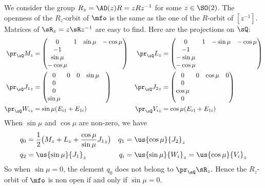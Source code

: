 We consider the group $R_z=\AD(z)R=zRz^{-1}$ for some $z\in \SO(2)$. The openness of the $R_z$-orbit of $\mfo$ is the same as the one of the $R$-orbit of $[z^{-1}]$. Matrices of $\sR_z=z\sR z^{-1}$ are easy to find. Here are the projections on $\sQ$:
\begin{subequations}
	\begin{align}
		\pr_{\sQ} M_z     & =
		\begin{pmatrix}
			0 & 1 & \sin\mu & -\cos\mu \\
			-1                         \\
			\sin\mu                    \\
			-\cos\mu
		\end{pmatrix}
		                  & \pr_{\sQ} L_z           & =
		\begin{pmatrix}
			0 & 1 & -\sin\mu & -\cos\mu \\
			-1                          \\-\sin\mu\\
			-\cos\mu
		\end{pmatrix}                                                     \\
		\pr_{\sQ} {J_1}_z & =
		\begin{pmatrix}
			0 & 0 & 0 & \sin\mu & \\
			0                     \\
			0                     \\
			\sin\mu
		\end{pmatrix}
		                  & \pr_{\sQ} {J_2}_z       & =
		\begin{pmatrix}
			0 & 0 & \cos\mu & 0 \\
			0                   \\
			\cos\mu             \\
			0
		\end{pmatrix}                                                                       \\
		\pr_{\sQ} {W_i}_z & =\sin\mu(E_{i1}+E_{1i}) & \pr_{\sQ} {V_i}_z & =\cos\mu(E_{i1}+E_{1i})
	\end{align}
\end{subequations}
When $\sin\mu$ and $\cos\mu$ are non-zero, we have
\begin{subequations}
	\begin{align}
		q_0 & =\frac{1}{2}\big(M_z+L_z+\frac{\cos\mu}{\sin\mu}{J_1}_z\big) & q_1 & =\us{\cos\mu}{J_2}_z                     \\
		q_2 & =\us{\sin\mu}{J_1}_z                                         & q_i & =\us{\sin\mu}{W_i}_z=\us{\cos\mu}{V_i}_z
	\end{align}
\end{subequations}
So when $\sin\mu=0$, the element $q_{0}$ does not belong to $\pr_{\sQ}\sR_{z}$. Hence the $R_z$-orbit of $\mfo$ is non open if and only if $\sin \mu=0$.

